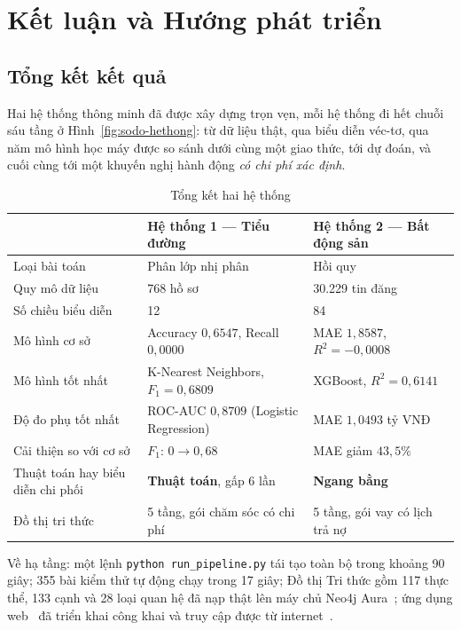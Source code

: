 \chapter{Kết luận và Hướng phát triển}
\label{ch:ketluan}

\section{Tổng kết kết quả}
\label{sec:tongket}

Hai hệ thống thông minh đã được xây dựng trọn vẹn, mỗi hệ thống đi hết chuỗi
sáu tầng ở Hình~\ref{fig:sodo-hethong}: từ dữ liệu thật, qua biểu diễn véc-tơ,
qua năm mô hình học máy được so sánh dưới cùng một giao thức, tới dự đoán, và
cuối cùng tới một khuyến nghị hành động \emph{có chi phí xác định}.

\begin{table}[H]
\centering
\caption{Tổng kết hai hệ thống}
\label{tab:tongket}
\small
\begin{tabularx}{\textwidth}{@{}L{3.4cm}XX@{}}
\toprule
 & \textbf{Hệ thống 1 --- Tiểu đường} & \textbf{Hệ thống 2 --- Bất động sản} \\
\midrule
Loại bài toán   & Phân lớp nhị phân & Hồi quy \\
Quy mô dữ liệu  & 768 hồ sơ & 30.229 tin đăng \\
Số chiều biểu diễn & 12 & 84 \\
Mô hình cơ sở   & Accuracy $0{,}6547$, Recall $0{,}0000$ & MAE $1{,}8587$, $R^2 = -0{,}0008$ \\
Mô hình tốt nhất & K-Nearest Neighbors, $F_1 = 0{,}6809$ & XGBoost, $R^2 = 0{,}6141$ \\
Độ đo phụ tốt nhất & ROC-AUC $0{,}8709$ (Logistic Regression) & MAE $1{,}0493$ tỷ VNĐ \\
Cải thiện so với cơ sở & $F_1$: $0 \to 0{,}68$ & MAE giảm $43{,}5\%$ \\
Thuật toán hay biểu diễn chi phối & \textbf{Thuật toán}, gấp 6 lần & \textbf{Ngang bằng} \\
Đồ thị tri thức & 5 tầng, gói chăm sóc có chi phí & 5 tầng, gói vay có lịch trả nợ \\
\bottomrule
\end{tabularx}
\end{table}

Về hạ tầng: một lệnh \texttt{python run\_pipeline.py} tái tạo toàn bộ trong
khoảng 90 giây; 355 bài kiểm thử tự động chạy trong 17 giây; Đồ thị Tri thức
gồm 117 thực thể, 133 cạnh và 28 loại quan hệ đã nạp thật lên máy chủ Neo4j
Aura~\cite{neo4j}; ứng dụng web~\cite{streamlit} đã triển khai công khai và truy cập được từ internet~\cite{repo}.

